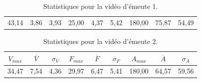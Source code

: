 \begin{appendices}
\begin{table}
\begin{tabular}{c c c c c c c c c}
			43,14		& 3,86				& 3,93			& 25,00		& 4,37				& 5,42			& 180,00	& 75,87				& 54,49			\bigstrut[t] \\
		\end{tabular}
		\caption[Statistiques pour la vidéo d'émeute 1]{Statistiques pour la vidéo d'émeute 1.}
		\label{tab:riot_stats}
	\end{table}
	


	\begin{table}
		\centering
		\begin{tabular}{c c c c c c c c c}
			$V_{max}$	& $\overline{V}$	& $\sigma_{V}$	& $F_{max}$	& $\overline{F}$	& $\sigma_{F}$	& $A_{max}$	& $\overline{A}$	& $\sigma_{A}$	\bigstrut[b] \\ \hline
	
			34,47		& 7,54				& 4,36			& 29,97		& 6,47				& 5,41			& 180,00	& 64,57				& 59,56			\bigstrut[t] \\
		\end{tabular}
		\caption[Statistiques pour la vidéo d'émeute 2]{Statistiques pour la vidéo d'émeute 2.}
		\label{tab:riot2a_stats}
	\end{table}



\end{appendices}
